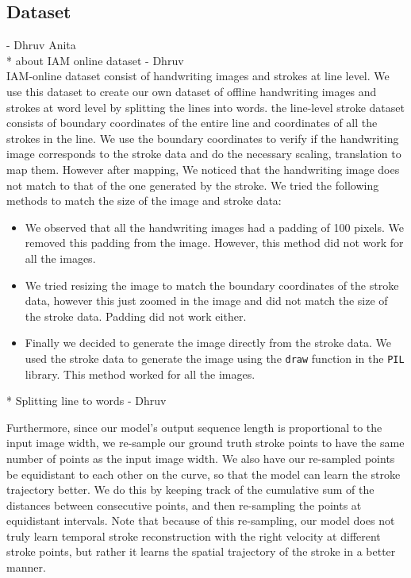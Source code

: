 \documentclass[10pt,twocolumn,letterpaper]{article}
\begin{document}
\subsection{Dataset} - Dhruv Anita \\
* about IAM online dataset - Dhruv \\

IAM-online dataset consist of handwriting images and strokes at line level. We use this dataset to create our own dataset of offline handwriting images and strokes at word level by splitting the lines into words. the line-level stroke dataset consists of boundary coordinates of the entire line and coordinates of all the strokes in the line. We use the boundary coordinates to verify if the handwriting image corresponds to the stroke data and do the necessary scaling, translation to map them. However after mapping, We noticed that the handwriting image does not match to that of the one generated by the stroke. We tried the following methods to match the size of the image and stroke data:
\begin{itemize}
  \item We observed that all the handwriting images had a padding of 100 pixels. We removed this padding from the image. However, this method did not work for all the images.
  \item We tried resizing the image to match the boundary coordinates of the stroke data, however this just zoomed in the image and did not match the size of the stroke data. Padding did not work either.
  \item Finally we decided to generate the image directly from the stroke data. We used the stroke data to generate the image using the \texttt{draw} function in the \texttt{PIL} library. This method worked for all the images.
\end{itemize}





* Splitting line to words - Dhruv

Furthermore, since our model's output sequence length is proportional to the input image width, we re-sample our ground truth stroke points to have the same number of points as the input image width. We also have our re-sampled points be equidistant to each other on the curve, so that the model can learn the stroke trajectory better. We do this by keeping track of the cumulative sum of the distances between consecutive points, and then re-sampling the points at equidistant intervals. Note that because of this re-sampling, our model does not truly learn temporal stroke reconstruction with the right velocity at different stroke points, but rather it learns the spatial trajectory of the stroke in a better manner.
\end{document}

